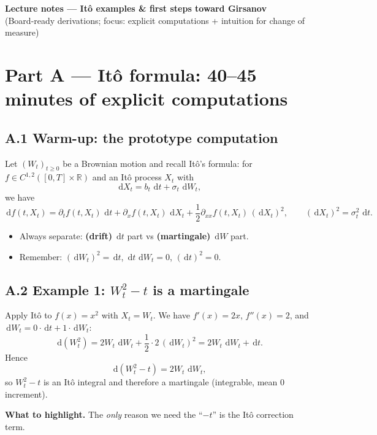 \documentclass[11pt]{article}
\theoremstyle{definition}
\theoremstyle{remark}
\newcommand{\R}{\mathbb{R}}
\newcommand{\1}{\mathbf{1}}
\newcommand{\dd}{\,\mathrm{d}}
\theoremstyle{definition}
\begin{document}
\begin{center}
{\Large \textbf{Lecture notes --- It\^o examples \& first steps toward Girsanov}}\\[0.25em]
{\small (Board-ready derivations; focus: explicit computations + intuition for change of measure)}
\end{center}

\vspace{-0.5em}


\section*{Part A --- It\^o formula: 40--45 minutes of explicit computations}

\subsection*{A.1 Warm-up: the prototype computation}
Let $(W_t)_{t\ge 0}$ be a Brownian motion and recall It\^o's formula:
for $f\in C^{1,2}([0,T]\times\R)$ and an It\^o process $X_t$ with
\[
\dd X_t = b_t\,\dd t + \sigma_t\,\dd W_t,
\]
we have
\[
\dd f(t,X_t)
=
\partial_t f(t,X_t)\,\dd t
+ \partial_x f(t,X_t)\,\dd X_t
+ \frac12 \partial_{xx} f(t,X_t)\,(\dd X_t)^2,
\qquad (\dd X_t)^2=\sigma_t^2\,\dd t.
\]


\begin{itemize}[leftmargin=1.5em, itemsep=0.25em]
\item Always separate: \textbf{(drift)} $\dd t$ part vs \textbf{(martingale)} $\dd W$ part.
\item Remember: $(\dd W_t)^2=\dd t$, $\dd t\,\dd W_t=0$, $(\dd t)^2=0$.
\end{itemize}


\subsection*{A.2 Example 1: $W_t^2-t$ is a martingale}
Apply It\^o to $f(x)=x^2$ with $X_t=W_t$.
We have $f'(x)=2x$, $f''(x)=2$, and $\dd W_t = 0\cdot \dd t + 1\cdot \dd W_t$:
\[
\dd(W_t^2) = 2W_t\,\dd W_t + \frac12\cdot 2 \,(\dd W_t)^2
= 2W_t\,\dd W_t + \dd t.
\]
Hence
\[
\dd(W_t^2-t)=2W_t\,\dd W_t,
\]
so $W_t^2-t$ is an It\^o integral and therefore a martingale (integrable, mean $0$ increment).


\textbf{What to highlight.} The \emph{only} reason we need the ``$-t$'' is the It\^o correction term.
\end{document}
